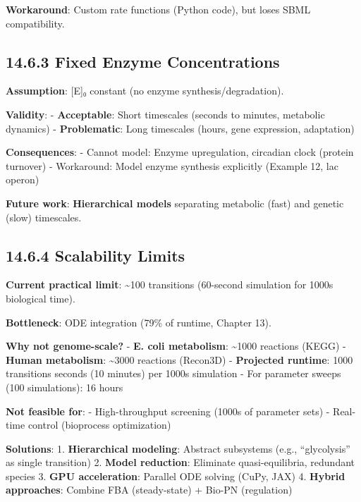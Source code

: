\textbf{Workaround}: Custom rate functions (Python code), but loses SBML
compatibility.

\hypertarget{fixed-enzyme-concentrations}{%
\subsection{14.6.3 Fixed Enzyme
Concentrations}\label{fixed-enzyme-concentrations}}

\textbf{Assumption}: {[}E{]}₀ constant (no enzyme
synthesis/degradation).

\textbf{Validity}: - \textbf{Acceptable}: Short timescales (seconds to
minutes, metabolic dynamics) - \textbf{Problematic}: Long timescales
(hours, gene expression, adaptation)

\textbf{Consequences}: - Cannot model: Enzyme upregulation, circadian
clock (protein turnover) - Workaround: Model enzyme synthesis explicitly
(Example 12, lac operon)

\textbf{Future work}: \textbf{Hierarchical models} separating metabolic
(fast) and genetic (slow) timescales.

\hypertarget{scalability-limits}{%
\subsection{14.6.4 Scalability Limits}\label{scalability-limits}}

\textbf{Current practical limit}: \textasciitilde100 transitions
(60-second simulation for 1000s biological time).

\textbf{Bottleneck}: ODE integration (79\% of runtime, Chapter 13).

\textbf{Why not genome-scale?} - \textbf{E. coli metabolism}:
\textasciitilde1000 reactions (KEGG) - \textbf{Human metabolism}:
\textasciitilde3000 reactions (Recon3D) - \textbf{Projected runtime}:
1000 transitions  seconds (10 minutes) per 1000s simulation - For
parameter sweeps (100 simulations): 16 hours

\textbf{Not feasible for}: - High-throughput screening (1000s of
parameter sets) - Real-time control (bioprocess optimization)

\textbf{Solutions}: 1. \textbf{Hierarchical modeling}: Abstract
subsystems (e.g., ``glycolysis'' as single transition) 2. \textbf{Model
reduction}: Eliminate quasi-equilibria, redundant species 3. \textbf{GPU
acceleration}: Parallel ODE solving (CuPy, JAX) 4. \textbf{Hybrid
approaches}: Combine FBA (steady-state) + Bio-PN (regulation)


